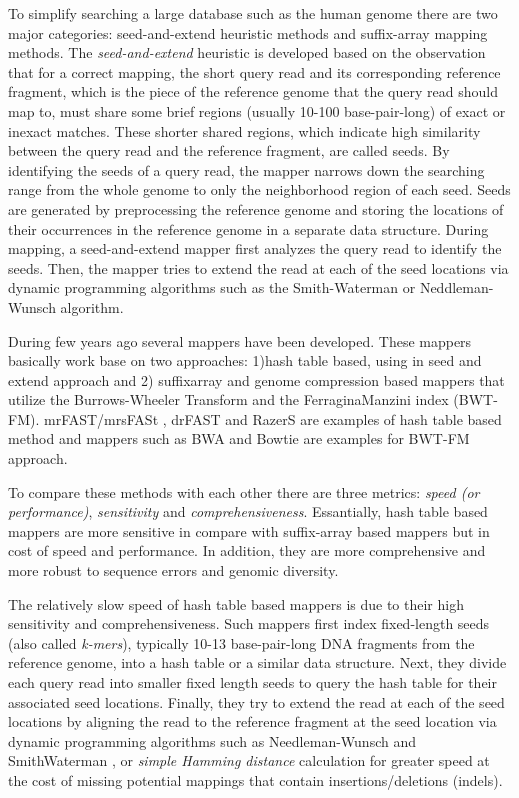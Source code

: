 To simplify searching a large database such as the human genome there are two major categories: seed-and-extend heuristic methods and suffix-array mapping methods. The \emph{seed-and-extend} heuristic is developed based on the observation that for a correct mapping, the short query read and its corresponding reference fragment, which is the piece of the reference genome that the query read should map to, must share some brief regions (usually 10-100 base-pair-long) of exact or inexact matches. These shorter shared regions, which indicate high similarity between the query read and the reference fragment, are called seeds. By identifying the seeds of a query read, the mapper narrows down the searching range from the whole genome to only the neighborhood region of each seed. Seeds are generated by preprocessing the reference genome and storing the locations of their occurrences in the reference genome in a separate data structure. During mapping, a seed-and-extend mapper first analyzes the query read to identify the seeds. Then, the mapper tries to extend the read at each of the seed locations via dynamic programming algorithms such as the Smith-Waterman \citep{smith1981identification} or Neddleman-Wunsch \citep{needleman} algorithm.

During few years ago several mappers have been developed. These mappers basically work base on two approaches: 1)hash table based, using in seed and extend approach and 2) suffixarray and genome compression based mappers that utilize the Burrows-Wheeler Transform and the FerraginaManzini index (BWT-FM).  mrFAST/mrsFASt \cite{mrfast}\cite{mrsfast}, drFAST\cite{drfast} and RazerS\cite{razers} are examples of hash table based method and mappers such as BWA\cite{bwa} and Bowtie\cite{bowtie} are examples for BWT-FM approach. 

To compare these  methods with each other there are three metrics: \emph{speed (or performance)}, \emph{sensitivity} and \emph{comprehensiveness}. Essantially, hash table based mappers are more sensitive in compare with suffix-array based mappers but in cost of speed and performance. In addition, they are more comprehensive and more robust to sequence errors and genomic diversity.

The relatively slow speed of hash table based mappers is due to their high sensitivity and comprehensiveness. Such mappers first index fixed-length seeds (also called \emph{k-mers}), typically 10-13 base-pair-long DNA fragments from the reference genome, into a hash table or a similar data structure. Next, they divide each query read into smaller fixed length seeds to query the hash table for their associated seed locations. Finally, they try to extend the read at each of the seed locations by aligning the read to the reference fragment at the seed location via dynamic programming algorithms such as Needleman-Wunsch \cite{needleman} and SmithWaterman \cite{smith1981identification}, or \emph{simple Hamming distance} calculation for greater speed at the cost of missing potential mappings that contain insertions/deletions (indels).

